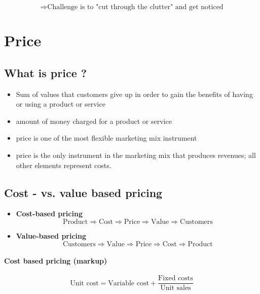 \documentclass[a4paper,titlepage] {scrartcl}
\begin{document}
\begin{equation}
	\Rightarrow
	\text{Challenge is to "cut through the clutter" and get noticed}
\end{equation}


\section{Price}

\subsection{What is price ?} %
\label{sub:what_is_price_}
\begin{itemize}
	\item Sum of values that customers give up in order to gain the benefits of having or using a product or service
	\item amount of money charged for a product or service
	\item price is one of the most flexible marketing mix instrument
	\item price is the only instrument in the marketing mix that produces revenues; all other elements represent costs.
	
\end{itemize}


\subsection{Cost - vs. value based pricing}
\begin{itemize}
	\item \textbf{Cost-based pricing}
			\begin{equation}
				\text{Product}\Rightarrow
				\text{Cost}\Rightarrow
				\text{Price}\Rightarrow
				\text{Value}\Rightarrow
				\text{Customers}
			\end{equation}
	\item \textbf{Value-based pricing}
			\begin{equation}
				\text{Customers}\Rightarrow
				\text{Value}\Rightarrow
				\text{Price}\Rightarrow
				\text{Cost}\Rightarrow
				\text{Product}
			\end{equation}
\end{itemize}

\paragraph{Cost based pricing (markup)} %
\label{par:cost_based_pricing_markup_}
\begin{equation}
	\text{Unit cost} = \text{Variable cost} + \frac{\text{Fixed costs}}{\text{Unit sales}}
\end{equation}
\end{document}
